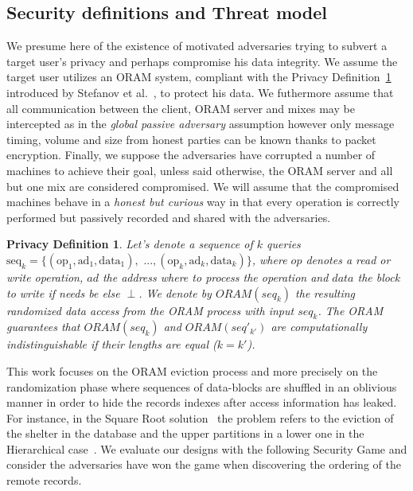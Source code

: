 \documentclass[USenglish,oneside,twocolumn]{article}
\newtheorem{privdef}{Privacy Definition}
\begin{document}
\subsection{Security definitions and Threat model}\label{Threat}

We presume here of the existence of motivated adversaries trying to subvert a target user's privacy and perhaps compromise his data integrity. We assume the target user utilizes an ORAM system, compliant with the Privacy Definition~\ref{def:Oram} introduced by Stefanov et al.~\cite{stefanov2011towards}, to protect his data.
We futhermore assume that all communication between the client, ORAM server and mixes may be intercepted as in the \textit{global passive adversary} assumption however only message timing, volume and size from honest parties can be known thanks to packet encryption.
Finally, we suppose the adversaries have corrupted a number of machines to achieve their goal, unless said otherwise, the ORAM server and all but one mix are considered compromised. We will assume that the compromised machines behave in a \textit{honest but curious} way in that every operation is correctly performed but passively recorded and shared with the adversaries.

\begin{privdef}\label{def:Oram}
Let's denote a sequence of $k$ queries $\text{seq}_k=\{(\text{op}_1, \text{ad}_1, \text{data}_1), \text{ ...},(\text{op}_k, \text{ad}_k, \text{data}_k)\}$, where $op$ denotes a read or write operation, $ad$ the address where to process the operation and $data$ the block to write if needs be else $\perp$.
We denote by $ORAM(seq_k)$ the resulting randomized data access from the ORAM process with input $seq_k$.
The ORAM guarantees that $ORAM(seq_k)$ and $ORAM(seq'_{k'})$ are computationally indistinguishable if their lengths are equal ($k=k'$).
\end{privdef}

This work focuses on the ORAM eviction process and more precisely on the randomization phase where sequences of data-blocks are shuffled in an oblivious manner in order to hide the records indexes after access information has leaked. For instance, in the Square Root solution~\cite{ostrovsky1990efficient} the problem refers to the eviction of the shelter in the database and the upper partitions in a lower one in the Hierarchical case~\cite{goldreich1996software}. We evaluate our designs with the following Security Game and consider the adversaries have won the game when discovering the ordering of the remote records.
\end{document}
